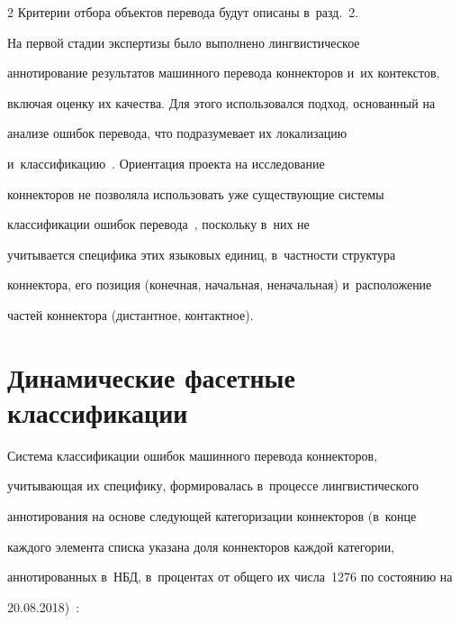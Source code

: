 \begin{multicols}{2}
Критерии отбора объектов перевода будут описаны в~разд.~2.











   





  На первой стадии экспертизы было выполнено лингвистическое 


аннотирование результатов машинного перевода коннекторов и~их контекстов,\linebreak 


включая оценку их качества. Для этого использовался подход, основанный на 


анализе ошибок перевода, что подразумевает их локализацию 


и~классифи\-кацию~\cite{13-gz}. Ориентация проекта на исследование 


коннекторов не позволяла использовать уже существующие системы 


классификации ошибок перевода~\cite{3-gz, 14-gz}, поскольку в~них не 


учитывается специфика этих языковых единиц, в~част\-ности структура 


коннектора, его позиция (конечная, начальная, неначальная) и~расположение\linebreak 


частей коннектора (дистантное, контактное).





\section{Динамические фасетные классификации}





  Система классификации ошибок машинного перевода коннекторов, 


учитывающая их специфику, формировалась в~процессе лингвистического 


аннотирования на основе следующей категоризации коннекторов (в~конце 


каждого элемента списка указана доля коннекторов каждой категории, 


аннотированных в~НБД, в~процентах от общего их числа~1276 по состоянию на 


20.08.2018)~\cite{15-gz}:



\end{multicols}
